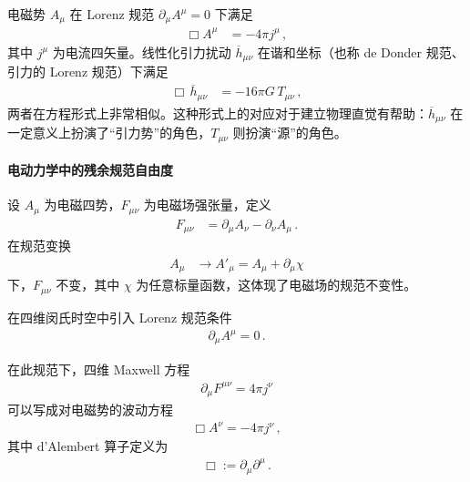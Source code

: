 \begin{derivationnote}
电磁势 $A_{\mu}$ 在 Lorenz 规范 $\partial_{\mu}A^{\mu}=0$ 下满足
\begin{align}
\Box A^{\mu}
&=
-4\pi j^{\mu}\,,
\end{align}
其中 $j^{\mu}$ 为电流四矢量。线性化引力扰动 $\overline{h}_{\mu\nu}$ 在谐和坐标（也称 de Donder 规范、引力的 Lorenz 规范）下满足
\begin{align}
\Box\,\overline{h}_{\mu\nu}
&=
-16\pi G\,T_{\mu\nu}\,,
\end{align}
两者在方程形式上非常相似。这种形式上的对应对于建立物理直觉有帮助：$\overline{h}_{\mu\nu}$ 在一定意义上扮演了“引力势”的角色，$T_{\mu\nu}$ 则扮演“源”的角色。
\end{derivationnote}

\paragraph{电动力学中的残余规范自由度}


\begin{definition}
设 $A_{\mu}$ 为电磁四势，$F_{\mu\nu}$ 为电磁场强张量，定义
\begin{align}
F_{\mu\nu}
&=
\partial_{\mu}A_{\nu}
-
\partial_{\nu}A_{\mu}\,.
\end{align}
在规范变换
\begin{align}
A_{\mu} &\longrightarrow A'_{\mu}
= A_{\mu} + \partial_{\mu}\chi
\end{align}
下，$F_{\mu\nu}$ 不变，其中 $\chi$ 为任意标量函数，这体现了电磁场的规范不变性。

在四维闵氏时空中引入 Lorenz 规范条件
\begin{align}
\partial_{\mu}A^{\mu} = 0\,.
\end{align}
\end{definition}

在此规范下，四维 Maxwell 方程
\begin{align}
\partial_{\mu}F^{\mu\nu} = 4\pi j^{\nu}
\end{align}
可以写成对电磁势的波动方程
\begin{align}
\Box A^{\nu} = -4\pi j^{\nu}\,,
\end{align}
其中 d'Alembert 算子定义为
\begin{align}
\Box := \partial_{\mu}\partial^{\mu}\,.
\end{align}

